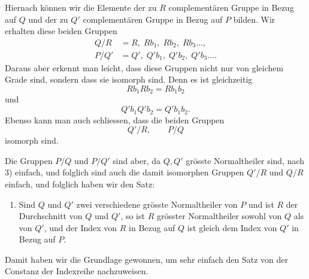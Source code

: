 \documentclass[11pt]{article}
\begin{document}
Hiernach können wir die Elemente der zu $R$ complementären Gruppe in Bezug auf $Q$ und der zu $Q'$ complementären Gruppe in Bezug auf $P$ bilden. Wir erhalten diese beiden Gruppen
\begin{equation}
\begin{array}{ll}
Q/R &= R,\;Rb_1,\;Rb_2,\;Rb_3\ldots,\\
P/Q' &= Q',\;Q'b_1,\;Q'b_2,\;Q'b_3\ldots.
\end{array}
\tag{22}
\end{equation}
Daraus aber erkennt man leicht, dass diese Gruppen nicht nur von gleichem Grade sind, sondern dass sie isomorph sind. Denn es ist gleichzeitig
\[
Rb_1Rb_2=Rb_1b_2
\]
und
\[
Q'b_1Q'b_2=Q'b_1b_2.
\]
Ebenso kann man auch schliessen, dass die beiden Gruppen
\[
Q'/R,
\qquad P/Q
\]
isomorph sind.

Die Gruppen $P/Q$ und $P/Q'$ sind aber, da $Q,Q'$ grösste Normaltheiler sind, nach 3) einfach, und folglich sind auch die damit isomorphen Gruppen $Q'/R$ und $Q/R$ einfach, und folglich haben wir den Satz:
\begin{enumerate}[resume,label=\arabic*.]
\item Sind $Q$ und $Q'$ zwei verschiedene grösste Normaltheiler von $P$ und ist $R$ der Durchschnitt von $Q$ und $Q'$, so ist $R$ grösster Normaltheiler sowohl von $Q$ als von $Q'$, und der Index von $R$ in Bezug auf $Q$ ist gleich dem Index von $Q'$ in Bezug auf $P$.
\end{enumerate}

Damit haben wir die Grundlage gewonnen, um sehr einfach den Satz von der Constanz der Indexreihe nachzuweisen.
\end{document}
